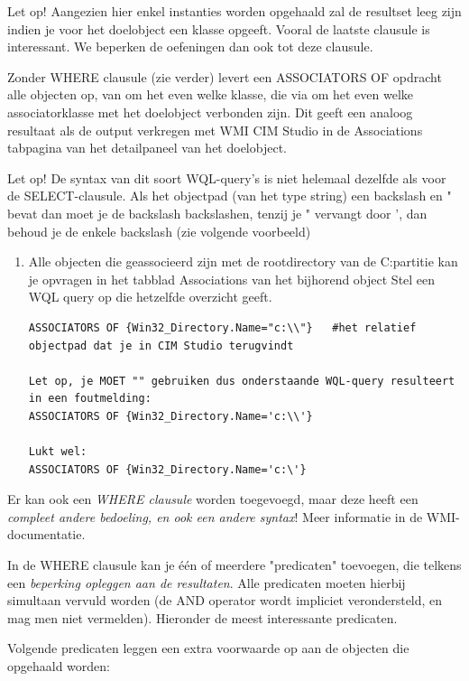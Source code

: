 \documentclass[11pt,a4paper]{report}
\begin{document}
Let op! Aangezien hier enkel instanties worden opgehaald zal de resultset leeg zijn indien je voor het doelobject een klasse opgeeft.
Vooral de laatste clausule is interessant. We beperken de oefeningen dan ook tot deze clausule.
\par Zonder WHERE clausule (zie verder) levert een ASSOCIATORS OF opdracht alle objecten op, van om het even welke klasse, die via om het even welke associatorklasse met het doelobject verbonden zijn. Dit geeft een analoog resultaat als de output verkregen met WMI CIM Studio in de Associations tabpagina van het detailpaneel van het doelobject.
\par Let op! De syntax van dit soort WQL-query's is niet helemaal dezelfde als voor de SELECT-clausule. Als het objectpad (van het type string) een backslash en " bevat dan moet je de backslash backslashen, tenzij je " vervangt door ', dan behoud je de enkele backslash (zie volgende voorbeeld)
\begin{enumerate}[resume]
	\item Alle objecten die geassocieerd zijn met de rootdirectory van de C:partitie kan je opvragen in het tabblad Associations van het bijhorend object Stel een WQL query op die hetzelfde overzicht geeft.
	\begin{lstlisting}
ASSOCIATORS OF {Win32_Directory.Name="c:\\"}   #het relatief objectpad dat je in CIM Studio terugvindt

Let op, je MOET "" gebruiken dus onderstaande WQL-query resulteert in een foutmelding:
ASSOCIATORS OF {Win32_Directory.Name='c:\\'}

Lukt wel:
ASSOCIATORS OF {Win32_Directory.Name='c:\'}
	\end{lstlisting}
\end{enumerate}
Er kan ook een \textit{WHERE clausule} worden toegevoegd, maar deze heeft een \textit{compleet andere bedoeling, en ook een andere syntax}! Meer informatie in de WMI-documentatie.
\par In de WHERE clausule kan je één of meerdere "predicaten" toevoegen, die telkens een \textit{beperking opleggen aan de resultaten}. Alle predicaten moeten hierbij simultaan vervuld worden (de AND operator wordt impliciet verondersteld, en mag men niet vermelden). Hieronder de meest interessante predicaten.
\par Volgende predicaten leggen een extra voorwaarde op aan de objecten die opgehaald worden:
\end{document}
